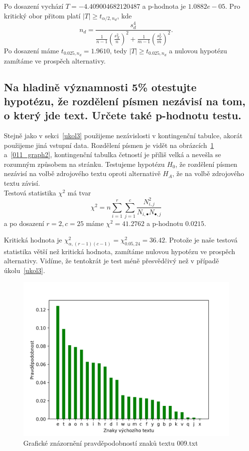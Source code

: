 \documentclass[12pt]{article}
\begin{document}
Po dosazení vychází $T = -4.409004682120487$ a p-hodnota je $1.0882e-05$.
Pro kritický obor přitom platí $|T| \ge t_{\alpha/2,n_d}$, kde
$$n_d = \frac{s_d^4}{\frac{1}{n-1}(\frac{s_X^2}{n})^2+\frac{1}{m-1}(\frac{s_Y^2}{m})^2}.$$
Po dosazení máme $t_{0.025, n_d} = 1.9610$, tedy $|T| \ge t_{0.025, n_d}$ a nulovou hypotézu zamítáme ve prospěch
alternativy.

  \subsection{Na hladině významnosti 5\% otestujte hypotézu, že rozdělení písmen nezávisí na tom, o který jde text. Určete také p-hodnotu testu.}
    Stejně jako v sekci~\ref{ukol3} použijeme nezávislosti v kontingenční tabulce, akorát použijeme jiná vstupní data.
    Rozdělení písmen je vidět na obrázcích~\ref{009_graph2} a~\ref{011_graph2}, kontingenční tabulka četností je příliš
    velká a nevešla se rozumným způsobem na stránku. Testujeme hypotézu $H_0$, že rozdělení
    písmen nezávisí na volbě zdrojového textu oproti alternativě $H_A$, že na volbě zdrojového textu závisí. \\
   
Testová statistika $\chi^2$ má tvar
$$\chi^2 = n\sum_{i =1}^r\sum_{j=1}^c \frac{N_{i,j}^2}{N_{i, \bullet}N_{\bullet, j}}$$
a po dosazení $r=2, c=25$ máme $\chi^2 = 41.2762$ a p-hodnotu $0.0215$.

Kritická hodnota je $\chi^2_{\alpha, (r-1)(c-1)} = \chi^2_{0.05,24} = 36.42$. Protože je naše testová statistika větší
než kritická hodnota, zamítáme nulovou hypotézu ve prospěch alternativy. Vidíme, že tentokrát je test méně přesvědčivý
než v případě úkolu~\ref{ukol3}.

\begin{figure}[!ht]
\includegraphics[scale=0.8]{009_char_prob.png}\centering\caption{Grafické znázornění pravděpodobností znaků textu 009.txt}\label{009_graph2}
\end{figure}
\end{document}
